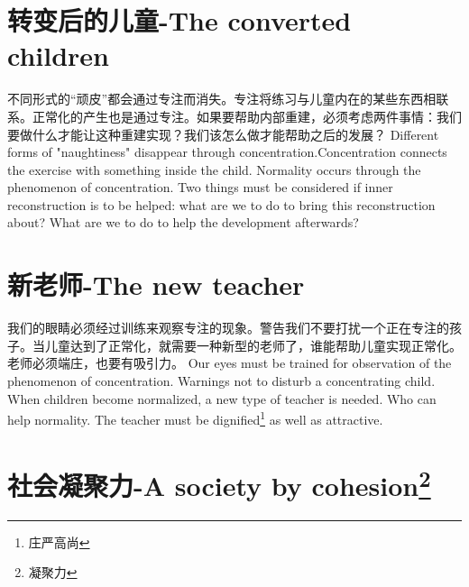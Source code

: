 \documentclass[lang=cn,10pt]{elegantbook}
\begin{document}
\chapter{转变后的儿童-The converted children}

\begin{tcolorbox}[title=摘要,
colback=red!5!white,
colframe=red!75!black,
fonttitle=\bfseries]
不同形式的“顽皮”都会通过专注而消失。专注将练习与儿童内在的某些东西相联系。正常化的产生也是通过专注。如果要帮助内部重建，必须考虑两件事情：我们要做什么才能让这种重建实现？我们该怎么做才能帮助之后的发展？
Different forms of "naughtiness" disappear through concentration.Concentration connects the exercise with something inside the child. Normality occurs through the phenomenon of concentration. Two things must be considered if inner reconstruction is to be helped: what are we to do to bring this reconstruction about? What are we to do to help the development afterwards?
\end{tcolorbox}

\chapter{新老师-The new teacher}

\begin{tcolorbox}[title=摘要,
colback=red!5!white,
colframe=red!75!black,
fonttitle=\bfseries]
我们的眼睛必须经过训练来观察专注的现象。警告我们不要打扰一个正在专注的孩子。当儿童达到了正常化，就需要一种新型的老师了，谁能帮助儿童实现正常化。老师必须端庄，也要有吸引力。
Our eyes must be trained for observation of the phenomenon of concentration. Warnings not to disturb a concentrating child. When children become normalized, a new type of teacher is needed. Who can help normality. The teacher must be dignified\footnote{庄严高尚} as well as attractive.
\end{tcolorbox}

\chapter{社会凝聚力-A society by cohesion\footnote{凝聚力}}
\end{document}
